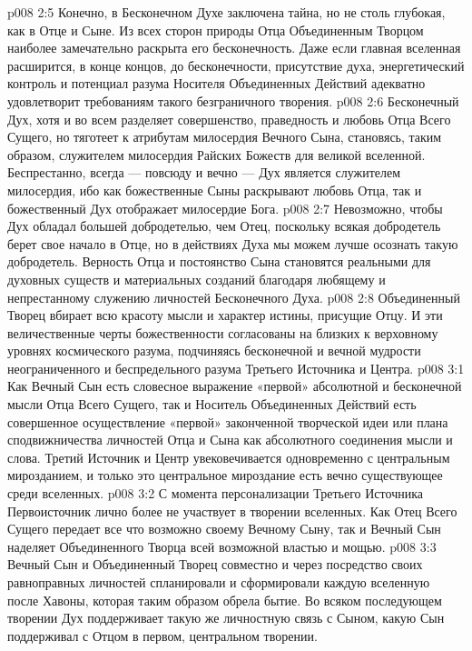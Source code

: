 \vs p008 2:5 \pc Конечно, в Бесконечном Духе заключена тайна, но не столь глубокая, как в Отце и Сыне. Из всех сторон природы Отца Объединенным Творцом наиболее замечательно раскрыта его бесконечность. Даже если главная вселенная расширится, в конце концов, до бесконечности, присутствие духа, энергетический контроль и потенциал разума Носителя Объединенных Действий адекватно удовлетворит требованиям такого безграничного творения.
\vs p008 2:6 Бесконечный Дух, хотя и во всем разделяет совершенство, праведность и любовь Отца Всего Сущего, но тяготеет к атрибутам милосердия Вечного Сына, становясь, таким образом, служителем милосердия Райских Божеств для великой вселенной. Беспрестанно, всегда --- повсюду и вечно --- Дух является служителем милосердия, ибо как божественные Сыны раскрывают любовь Отца, так и божественный Дух отображает милосердие Бога.
\vs p008 2:7 Невозможно, чтобы Дух обладал большей добродетелью, чем Отец, поскольку всякая добродетель берет свое начало в Отце, но в действиях Духа мы можем лучше осознать такую добродетель. Верность Отца и постоянство Сына становятся реальными для духовных существ и материальных созданий благодаря любящему и непрестанному служению личностей Бесконечного Духа.
\vs p008 2:8 Объединенный Творец вбирает всю красоту мысли и характер истины, присущие Отцу. И эти величественные черты божественности согласованы на близких к верховному уровнях космического разума, подчиняясь бесконечной и вечной мудрости неограниченного и беспредельного разума Третьего Источника и Центра.
\vs p008 3:1 Как Вечный Сын есть словесное выражение «первой» абсолютной и бесконечной мысли Отца Всего Сущего, так и Носитель Объединенных Действий есть совершенное осуществление «первой» законченной творческой идеи или плана сподвижничества личностей Отца и Сына как абсолютного соединения мысли и слова. Третий Источник и Центр увековечивается одновременно с центральным мирозданием, и только это центральное мироздание есть вечно существующее среди вселенных.
\vs p008 3:2 С момента персонализации Третьего Источника Первоисточник лично более не участвует в творении вселенных. Как Отец Всего Сущего передает все что возможно своему Вечному Сыну, так и Вечный Сын наделяет Объединенного Творца всей возможной властью и мощью.
\vs p008 3:3 Вечный Сын и Объединенный Творец совместно и через посредство своих равноправных личностей спланировали и сформировали каждую вселенную после Хавоны, которая таким образом обрела бытие. Во всяком последующем творении Дух поддерживает такую же личностную связь с Сыном, какую Сын поддерживал с Отцом в первом, центральном творении.
